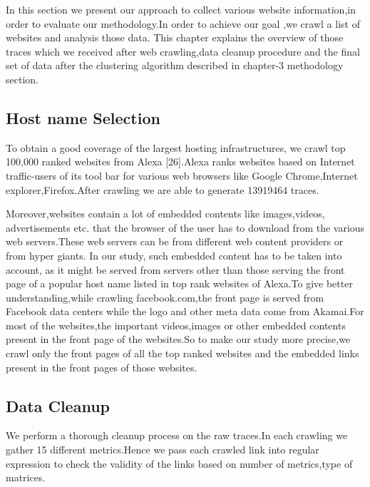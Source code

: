 In this section we present our approach to collect various website information,in order to evaluate our methodology.In order to achieve our goal ,we crawl a list of websites and analysis those data. This chapter explains the overview of those traces which we received after web crawling,data cleanup procedure and the final set of data after the clustering algorithm described in chapter-3 methodology section.
\subsection{Host name Selection}
To obtain a good coverage of the largest hosting infrastructures,
we crawl top 100,000 ranked websites from Alexa [26].Alexa ranks websites based on Internet traffic-users of its tool bar for various web browsers like Google Chrome,Internet explorer,Firefox.After crawling we are able to generate 13919464 traces.

Moreover,websites contain a lot of embedded contents like images,videos, advertisements etc. that the browser of the user has to download from the various web servers.These web servers can be from different web content providers or from  hyper giants. In our study, such embedded content has to be taken into account, as it might be served from servers other than those serving the front page of a popular host name listed in top rank websites of Alexa.To give better understanding,while crawling facebook.com,the front page is served from Facebook data centers while the logo and other meta data come from Akamai.For most of the websites,the important videos,images or other embedded contents present in the front page of the websites.So to make our study more precise,we crawl only the front pages of all the top ranked websites and the embedded links present in the front pages of those websites.

\subsection{Data Cleanup}
We perform a thorough cleanup process on the raw traces.In each crawling we gather 15 different metrics.Hence we pass each crawled link into regular expression to check the validity of the links based on number of metrics,type of matrices.

